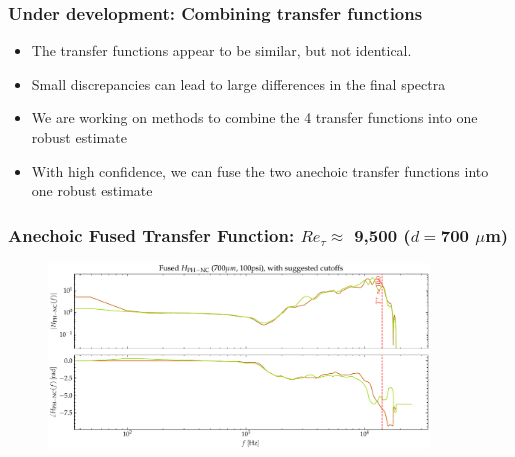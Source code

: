\documentclass[aspectratio=169,9pt]{beamer}
\begin{document}
\begin{frame}
  \frametitle{Under development: Combining transfer functions}
  \begin{itemize}
    \centering
    \item The transfer functions appear to be similar, but not identical.
    \item Small discrepancies can lead to large differences in the final spectra
    \item We are working on methods to combine the 4 transfer functions into one robust estimate
    \item With high confidence, we can fuse the two anechoic transfer functions into one robust estimate
  \end{itemize}
\end{frame}

\begin{frame}
  \frametitle{Anechoic Fused Transfer Function: $Re_\tau \approx$ 9,500 ($d=$700 $\mu$m)}
  \begin{figure}
    \centering
    \includegraphics[width=0.9\textwidth]{tf_calib/700_100psi_H_anechoic_fused.pdf}
  \end{figure}
\end{frame}
\end{document}
